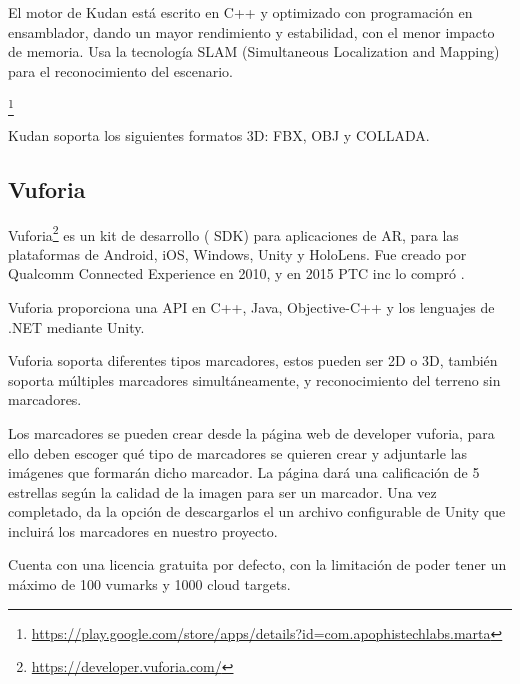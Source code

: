 El motor de Kudan está escrito en C++ y optimizado con programación en ensamblador, dando un mayor rendimiento y estabilidad, con el menor impacto de memoria.
Usa la tecnología SLAM (Simultaneous Localization and Mapping) para el reconocimiento del escenario.

\footnote{\url{https://play.google.com/store/apps/details?id=com.apophistechlabs.marta}}

Kudan soporta los siguientes formatos 3D: FBX, OBJ y COLLADA.

\subsection{Vuforia}\label{sub:Def_Vuforia}
Vuforia\footnote{\url{https://developer.vuforia.com/}} es un kit de desarrollo ( SDK) para aplicaciones de AR, para las plataformas de Android, iOS, Windows, Unity y HoloLens. Fue creado por Qualcomm Connected Experience en 2010, y en 2015 PTC inc lo compró \cite{simonetti2013vuforia}.

Vuforia proporciona una API en C++, Java, Objective-C++ y los lenguajes de .NET mediante Unity.

Vuforia soporta diferentes tipos marcadores, estos pueden ser 2D o 3D, también soporta múltiples marcadores simultáneamente, y reconocimiento del terreno sin marcadores.

Los marcadores se pueden crear desde la página web de developer vuforia, para ello deben escoger qué tipo de marcadores se quieren crear y adjuntarle las imágenes que formarán dicho marcador. La página dará una calificación de 5 estrellas según la calidad de la imagen para ser un marcador. Una vez completado, da la opción de descargarlos el un archivo configurable de Unity que incluirá los marcadores en nuestro proyecto.



Cuenta con una licencia gratuita por defecto, con la limitación de poder tener un máximo de 100 vumarks y 1000 cloud targets.

